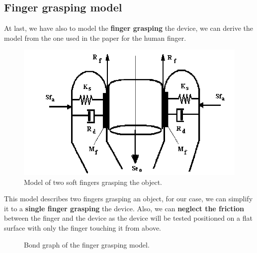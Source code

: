 \subsection{Finger grasping model}
\begin{samepage}
    At last, we have also to model the \textbf{finger grasping} the device, we can derive the model from the one used in the paper \cite{Finger_grasping_model} for the human finger.
    \nopagebreak

    \begin{figure}[H]
        \centering
        \includegraphics[width = 0.4\linewidth]{Chapters/Chapter2/Modelling_of_Entire_System/Figures/Model-of-two-soft-fingers-grasping-the-object.png}
        \caption{Model of two soft fingers grasping the object.}
        \label{fig: Finger_grasping_model}
    \end{figure}
\end{samepage}

This model describes two fingers grasping an object, for our case, we can simplify it to a \textbf{single finger grasping} the device.
Also, we can \textbf{neglect the friction} between the finger and the device as the device will be tested positioned on a flat surface with only the finger touching it from above.
\begin{figure}[H]
    \centering
    \resizebox{.7\linewidth}{!}{
        
    }
    \caption{Bond graph of the finger grasping model.}
    \label{fig: Finger_grasping_bond_graph}
\end{figure}
